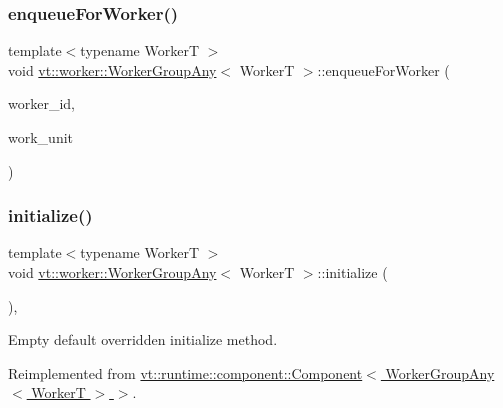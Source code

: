 \subsubsection{\texorpdfstring{enqueue\+For\+Worker()}{enqueueForWorker()}}
{\footnotesize\ttfamily template$<$typename WorkerT $>$ \\
void \hyperlink{structvt_1_1worker_1_1_worker_group_any}{vt\+::worker\+::\+Worker\+Group\+Any}$<$ WorkerT $>$\+::enqueue\+For\+Worker (\begin{DoxyParamCaption}\item[{\hyperlink{namespacevt_a656e362091da17b9b93d0655b36e3392}{Worker\+I\+D\+Type} const \&}]{worker\+\_\+id,  }\item[{\hyperlink{namespacevt_1_1worker_a59d2fcdafa81fc0af7f921a258e42202}{Work\+Unit\+Type} const \&}]{work\+\_\+unit }\end{DoxyParamCaption})}

\mbox{\label{structvt_1_1worker_1_1_worker_group_any_ad8bb855b98bf26337ca13df2bff5fb95}} 
\subsubsection{\texorpdfstring{initialize()}{initialize()}}
{\footnotesize\ttfamily template$<$typename WorkerT $>$ \\
void \hyperlink{structvt_1_1worker_1_1_worker_group_any}{vt\+::worker\+::\+Worker\+Group\+Any}$<$ WorkerT $>$\+::initialize (\begin{DoxyParamCaption}{ }\end{DoxyParamCaption})\hspace{0.3cm}{\ttfamily [override]}, {\ttfamily [virtual]}}



Empty default overridden initialize method. 



Reimplemented from \hyperlink{structvt_1_1runtime_1_1component_1_1_component_a7f07384d294e59796add9ce6be2d6410}{vt\+::runtime\+::component\+::\+Component$<$ Worker\+Group\+Any$<$ Worker\+T $>$ $>$}.

\mbox{\label{structvt_1_1worker_1_1_worker_group_any_ac0e40c916ea7620e2985ed29f66a5701}} 
